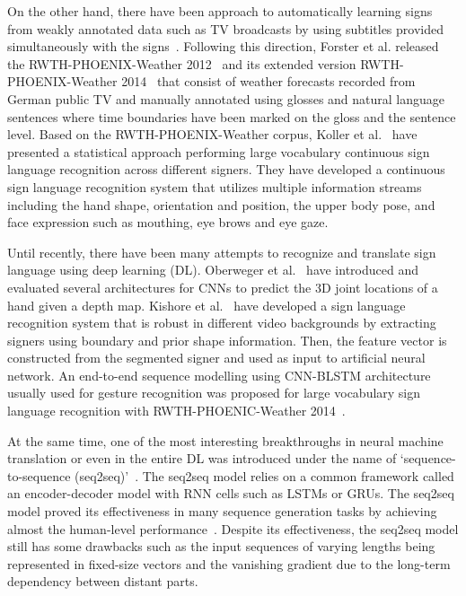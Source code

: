 \documentclass[10pt,twocolumn,letterpaper]{article}
\begin{document}
On the other hand, there have been approach to automatically learning signs from weakly annotated data such as TV broadcasts by using subtitles provided simultaneously with the signs~\cite{BuehlerZE09,CooperB09,PfisterCZ13}. Following this direction, Forster et al. released the RWTH-PHOENIX-Weather 2012~\cite{ForsterSHKZPN12} and its extended version RWTH-PHOENIX-Weather 2014~\cite{ForsterSKBN14} that consist of weather forecasts recorded from German public TV and manually annotated using glosses and natural language sentences where time boundaries have been marked on the gloss and the sentence level. Based on the RWTH-PHOENIX-Weather corpus, Koller et al.~\cite{KollerFN15} have presented a statistical approach performing large vocabulary continuous sign language recognition across different signers. They have developed a continuous sign language recognition system that utilizes multiple information streams including the hand shape, orientation and position, the upper body pose, and face expression such as mouthing, eye brows and eye gaze. 

Until recently, there have been many attempts to recognize and translate sign language using deep learning (DL). Oberweger et al.~\cite{OberwegerWL15} have introduced and evaluated several architectures for CNNs to predict the 3D joint locations of a hand given a depth map. Kishore et al.~\cite{KishoreSK14} have developed a sign language recognition system that is robust in different video backgrounds by extracting signers using boundary and prior shape information. Then, the feature vector is constructed from the segmented signer and used as input to artificial neural network. An end-to-end sequence modelling using CNN-BLSTM architecture usually used for gesture recognition was proposed for large vocabulary sign language recognition with RWTH-PHOENIC-Weather 2014~\cite{koller2017re}.

At the same time, one of the most interesting breakthroughs in neural machine translation or even in the entire DL was introduced under the name of `sequence-to-sequence (seq2seq)'~\cite{SutskeverVL14}. The seq2seq model relies on a common framework called an encoder-decoder model with RNN cells such as LSTMs or GRUs. The seq2seq model proved its effectiveness in many sequence generation tasks by achieving almost the human-level performance~\cite{SutskeverVL14}. Despite its effectiveness, the seq2seq model still has some drawbacks such as the input sequences of varying lengths being represented in fixed-size vectors and the vanishing gradient due to the long-term dependency between distant parts.
\end{document}

